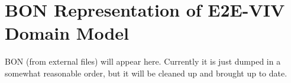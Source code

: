 \chapter{BON Representation of E2E-VIV Domain Model}
\label{appendix:domain_model}

BON (from external files) will appear here. Currently it is just
dumped in a somewhat reasonable order, but it will be cleaned up and
brought up to date.

